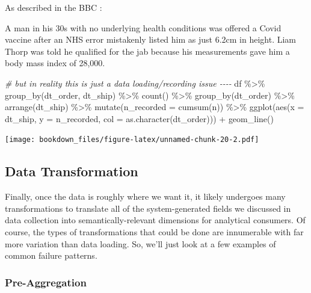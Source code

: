 \documentclass[
]{krantz}
\makeatletter
\newenvironment{Shaded}{\begin{snugshade}}{\end{snugshade}}
\newcommand{\AttributeTok}[1]{\textcolor[rgb]{0.61,0.61,0.61}{#1}}
\newcommand{\CommentTok}[1]{\textcolor[rgb]{0.37,0.37,0.37}{\textit{#1}}}
\newcommand{\FunctionTok}[1]{\textcolor[rgb]{0,0,0}{#1}}
\newcommand{\NormalTok}[1]{#1}
\newcommand{\SpecialCharTok}[1]{\textcolor[rgb]{0,0,0}{#1}}
\renewenvironment{quote}{\begin{VF}}{\end{VF}}
\newenvironment{kframe}{%
\medskip{}
\setlength{\fboxsep}{.8em}
 \def\at@end@of@kframe{}%
 \ifinner\ifhmode%
  \def\at@end@of@kframe{\end{minipage}}%
  \begin{minipage}{\columnwidth}%
 \fi\fi%
 \def\FrameCommand##1{\hskip\@totalleftmargin \hskip-\fboxsep
 \colorbox{shadecolor}{##1}\hskip-\fboxsep
     \hskip-\linewidth \hskip-\@totalleftmargin \hskip\columnwidth}%
 \MakeFramed {\advance\hsize-\width
   \@totalleftmargin\z@ \linewidth\hsize
   \@setminipage}}%
 {\par\unskip\endMakeFramed%
 \at@end@of@kframe}
\renewenvironment{Shaded}{\begin{kframe}}{\end{kframe}}
\makeatother
\begin{document}
As described in the BBC \citep{bbc_north_west_2021}:

\begin{quote}
A man in his 30s with no underlying health conditions was offered a Covid vaccine after an NHS error mistakenly listed him as just 6.2cm in height. Liam Thorp was told he qualified for the jab because his measurements gave him a body mass index of 28,000.
\end{quote}

\begin{Shaded}
\begin{Highlighting}[]
\CommentTok{\# but in reality this is just a data loading/recording issue {-}{-}{-}{-}}
\NormalTok{df }\SpecialCharTok{\%\textgreater{}\%}
  \FunctionTok{group\_by}\NormalTok{(dt\_order, dt\_ship) }\SpecialCharTok{\%\textgreater{}\%}
  \FunctionTok{count}\NormalTok{() }\SpecialCharTok{\%\textgreater{}\%}
  \FunctionTok{group\_by}\NormalTok{(dt\_order) }\SpecialCharTok{\%\textgreater{}\%}
  \FunctionTok{arrange}\NormalTok{(dt\_ship) }\SpecialCharTok{\%\textgreater{}\%}
  \FunctionTok{mutate}\NormalTok{(}\AttributeTok{n\_recorded =} \FunctionTok{cumsum}\NormalTok{(n)) }\SpecialCharTok{\%\textgreater{}\%}
  \FunctionTok{ggplot}\NormalTok{(}\FunctionTok{aes}\NormalTok{(}\AttributeTok{x =}\NormalTok{ dt\_ship, }\AttributeTok{y =}\NormalTok{ n\_recorded, }\AttributeTok{col =} \FunctionTok{as.character}\NormalTok{(dt\_order))) }\SpecialCharTok{+} \FunctionTok{geom\_line}\NormalTok{()}
\end{Highlighting}
\end{Shaded}

\texttt{[image: bookdown\_files/figure-latex/unnamed-chunk-20-2.pdf]}

\hypertarget{data-transformation-1}{%
\subsection{Data Transformation}\label{data-transformation-1}}

Finally, once the data is roughly where we want it, it likely undergoes many transformations to translate all of the system-generated fields we discussed in data collection into semantically-relevant dimensions for analytical consumers. Of course, the types of transformations that could be done are innumerable with far more variation than data loading. So, we'll just look at a few examples of common failure patterns.

\hypertarget{pre-aggregation-1}{%
\subsubsection{Pre-Aggregation}\label{pre-aggregation-1}}
\end{document}
